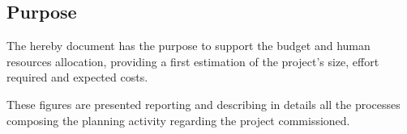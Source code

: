 \subsection{Purpose}

The hereby document has the purpose to support the budget and human resources allocation, providing a first estimation of the project's size, effort required and expected costs. 

These figures are presented reporting and describing in details all the processes composing the planning activity regarding the project commissioned.
